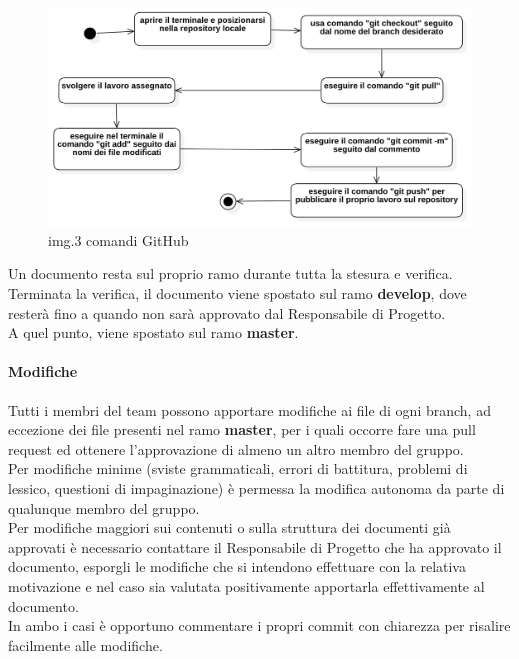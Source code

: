 				\begin{figure}[H]
    					\centering
    					\includegraphics[width=1.0\textwidth]{res/images/comandi_GitHub.png}
					\caption{img.3 comandi GitHub}
					\label{fig:img.3 comandi GitHub}
				\end{figure}
				
				Un documento resta sul proprio ramo durante tutta la stesura e verifica.  \\
				Terminata la verifica, il documento viene spostato sul ramo \textbf{develop}, dove resterà fino a quando non sarà approvato dal Responsabile di Progetto. \\
				A quel punto, viene spostato sul ramo \textbf{master}.
				
			\paragraph{ Modifiche}
				Tutti i membri del team possono apportare modifiche ai file di ogni branch, ad eccezione dei file presenti nel ramo \textbf{master}, per i quali occorre fare una pull request ed ottenere l’approvazione di almeno un altro membro del gruppo. \\
				Per modifiche minime (sviste grammaticali, errori di battitura, problemi di lessico, questioni di impaginazione) è permessa la modifica autonoma da parte di qualunque membro del gruppo. \\
				Per modifiche maggiori sui contenuti o sulla struttura dei documenti già approvati è necessario contattare il Responsabile di Progetto che ha approvato il documento, esporgli le modifiche che si intendono effettuare con la relativa motivazione e nel caso sia valutata positivamente apportarla effettivamente al documento.\\
				In ambo i casi è opportuno commentare i propri commit con chiarezza per risalire facilmente alle modifiche.\\

